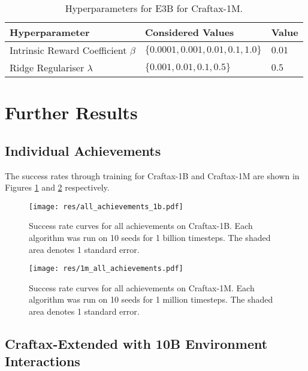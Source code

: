 \documentclass{article}
\theoremstyle{plain}
\theoremstyle{definition}
\theoremstyle{remark}
\begin{document}
\begin{table*}[t]
\centering
\begin{tabular}{@{}l l l@{}} 
    \toprule
    \textbf{Hyperparameter} & \textbf{Considered Values} & \textbf{Value} \\
    \midrule
    Intrinsic Reward Coefficient $\beta$ & $\{0.0001, 0.001, 0.01, 0.1, 1.0\}$ & $0.01$ \\
    Ridge Regulariser $\lambda$ & $\{0.001, 0.01, 0.1, 0.5\}$ & $0.5$ \\
    \bottomrule
\end{tabular}
\caption{Hyperparameters for E3B for Craftax-1M.}
\label{tab:craftax_1m_hyp_e3b}
\end{table*}



\section{Further Results}
\subsection{Individual Achievements} \label{app:achievement_results}

The success rates through training for Craftax-1B and Craftax-1M are shown in Figures \ref{fig:all_achievements_1b} and \ref{fig:all_achievements_1m} respectively.

\begin{figure}[H]
    \centering
    \texttt{[image: res/all\_achievements\_1b.pdf]}
    \caption{Success rate curves for all achievements on Craftax-1B.  Each algorithm was run on 10 seeds for 1 billion timesteps.  The shaded area denotes 1 standard error.}
    \label{fig:all_achievements_1b}
\end{figure}

\begin{figure}[H]
    \centering
    \texttt{[image: res/1m\_all\_achievements.pdf]}
    \caption{Success rate curves for all achievements on Craftax-1M.  Each algorithm was run on 10 seeds for 1 million timesteps.  The shaded area denotes 1 standard error.}
    \label{fig:all_achievements_1m}
\end{figure}

\subsection{Craftax-Extended with 10B Environment Interactions} \label{app:craftax_10b}
\end{document}
